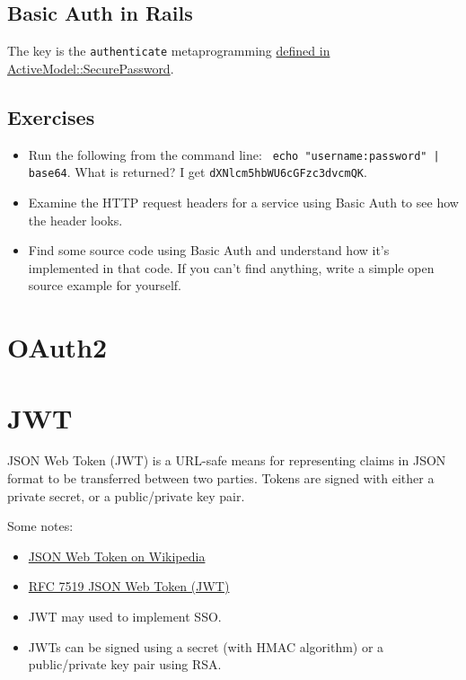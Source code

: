 \documentclass{article}
\begin{document}
\subsection{Basic Auth in Rails}

The key is the \texttt{authenticate} metaprogramming
\href{https://github.com/rails/rails/blob/fbe2433be6e052a1acac63c7faf287c52ed3c5ba/activemodel/lib/active_model/secure_password.rb#L119}{%
  defined in ActiveModel::SecurePassword}.


\subsection{Exercises}

\begin{itemize}
  \item Run the following from the command line: \texttt{%
      echo "username:password" | base64}. What is returned?
    I get \texttt{dXNlcm5hbWU6cGFzc3dvcmQK}.
  \item Examine the HTTP request headers for a service using Basic Auth
    to see how the header looks.
  \item Find some source code using Basic Auth and understand how
    it's implemented in that code. If you can't find anything, write
    a simple open source example for yourself.
\end{itemize}

\section{OAuth2}


\section{JWT}

JSON Web Token (JWT) is a URL-safe means for representing
claims in JSON format to be transferred between two parties.
Tokens are signed with either a private secret, or a public/private
key pair.

Some notes:

\begin{itemize}
  \item \href{https://en.wikipedia.org/wiki/JSON_Web_Token}{%
     JSON Web Token on Wikipedia}
  \item \href{https://tools.ietf.org/html/rfc7519}{%
     RFC 7519 JSON Web Token (JWT)}
 \item JWT may used to implement SSO.
 \item JWTs can be signed using a secret (with HMAC algorithm) or a
   public/private key pair using RSA.
\end{itemize}
\end{document}

